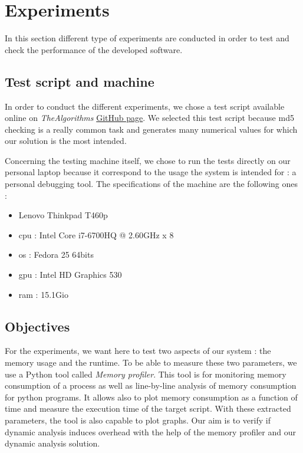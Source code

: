 

\chapter{Experiments} %
\label{chap:experiments}

In this section different type of experiments are conducted in order to test and check the performance of the developed software.

\section{Test script and machine}
In order to conduct the different experiments, we chose a test script available online on \textit{TheAlgorithms} \href{https://github.com/TheAlgorithms/Python/blob/master/hashes/md5.py}{GitHub page}. We selected this test script because \gls{md5} checking is a really common task and generates many numerical values for which our solution is the most intended. 

Concerning the testing machine itself, we chose to run the tests directly on our personal laptop because it correspond to the usage the system is intended for : a personal debugging tool. The specifications of the machine are the following ones :
\begin{itemize}
  \item Lenovo Thinkpad T460p
  \item \gls{cpu} : Intel Core i7-6700HQ @ 2.60GHz x 8
  \item \gls{os} : Fedora 25 64bits
  \item \gls{gpu} : Intel HD Graphics 530
  \item \gls{ram} : 15.1Gio
\end{itemize}

\section{Objectives}
For the experiments, we want here to test two aspects of our system : the memory usage and the runtime. To be able to measure these two parameters, we use a Python tool called \textit{Memory profiler}. This tool is for monitoring memory consumption of a process as well as line-by-line analysis of memory consumption for python programs. It allows also to plot memory consumption as a function of time and measure the execution time of the target script. With these extracted parameters, the tool is also capable to plot graphs. Our aim is to verify if dynamic analysis induces overhead with the help of the memory profiler and our dynamic analysis solution.

